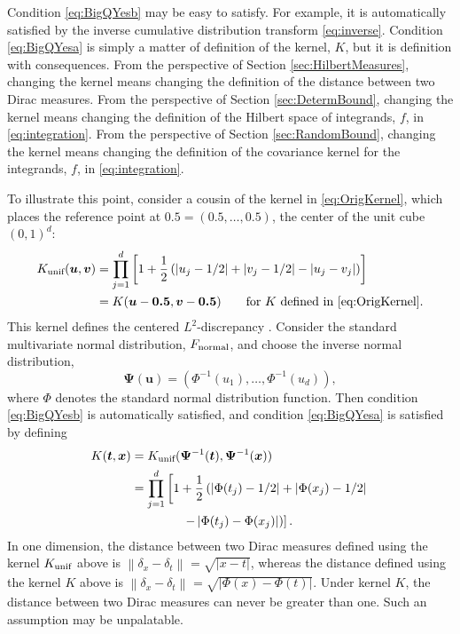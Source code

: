 \documentclass[graybox]{svmult}
\newcommand{\vx}{\boldsymbol{x}}
\newcommand{\vt}{\boldsymbol{t}}
\newcommand{\vu}{\boldsymbol{u}}
\newcommand{\vv}{\boldsymbol{v}}
\newcommand{\vPsi}{\boldsymbol{\Psi}}
\newcommand{\norm}[2][{}]{\ensuremath{\left \lVert #2 \right \rVert}_{#1}}
\newcommand{\unif}{\textup{unif}}
\newcommand{\normal}{\textup{normal}}
\begin{document}
Condition \eqref{eq:BigQYesb} may be easy to satisfy.  For example, it is automatically satisfied by the inverse cumulative distribution transform \eqref{eq:inverse}.  Condition \eqref{eq:BigQYesa} is simply a matter of definition of the kernel, $K$, but it is definition with consequences.  From the perspective of Section \ref{sec:HilbertMeasures}, changing the kernel means changing the definition of the distance between two Dirac measures.  From the perspective of Section \ref{sec:DetermBound}, changing the kernel means changing the definition of the Hilbert space of integrands, $f$, in \eqref{eq:integration}.   From the perspective of Section \ref{sec:RandomBound}, changing the kernel means changing the definition of the covariance kernel for the integrands, $f$, in \eqref{eq:integration}.

To illustrate this point, consider a cousin of the kernel in \eqref{eq:OrigKernel}, which places the reference point at $\boldsymbol{0.5} = (0.5, \ldots, 0.5)$, the center of the unit cube $(0,1)^d$:
\begin{align}
\label{eq:L2kernel}
    K_{\unif}(\vu,\vv) &= \prod_{j=1}^d\left[1+\frac{1}{2}\left(\left|u_j-1/2\right|+ \left|v_j- 1/2 \right|-\left |u_j-v_j \right| \right) \right] \\
    \nonumber
    & = K(\vu - \boldsymbol{0.5}, \vv - \boldsymbol{0.5}) \qquad \text{for $K$ defined in \eqref{eq:OrigKernel}}. 
\end{align}
This kernel defines the centered $L^2$-discrepancy \cite{Hic97a}.
Consider the standard multivariate normal distribution, $F_\normal$, and choose the inverse normal distribution,
\begin{equation} \label{eq:invNormTrans}
    \vPsi(\vu) = (\Phi^{-1}(u_1), \ldots, \Phi^{-1}(u_d)),
\end{equation}
where $\Phi$ denotes the standard normal distribution function.  Then condition \eqref{eq:BigQYesb} is automatically satisfied, and condition \eqref{eq:BigQYesa} is  satisfied by defining
\begin{align}
\nonumber
     K(\vt,\vx) &= K_{\unif}(\vPsi^{-1}(\vt),\vPsi^{-1}(\vx)) \\
     \nonumber
      &= \prod_{j=1}^d\left[1+\frac{1}{2}\left(\left|\Phi(t_j)-1/2\right|+ \left|\Phi(x_j)- 1/2 \right| \right . \right . \\
      & \qquad \qquad \left.  \left . -\left|\Phi(t_j)-\Phi(x_j)\right|\right)\right].
\end{align}
In one dimension, the distance between two Dirac measures defined using the kernel $K_\unif$ above is $\norm{\delta_{x} - \delta_{t}} = \sqrt{|x-t|}$, whereas the distance defined using the kernel $K$ above is $\norm{\delta_{x} - \delta_{t}} = \sqrt{|\Phi(x)-\Phi(t)|}$. Under kernel $K$, the distance between two Dirac measures can never be greater than one.  Such an assumption may be unpalatable.
\end{document}
